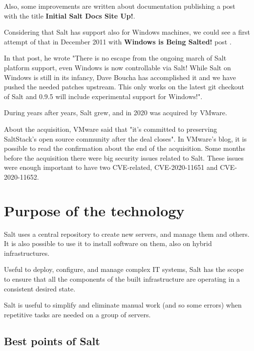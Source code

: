 \documentclass[12pt,a4paper,openright,twoside]{book}
\begin{document}
Also, some improvements are written about documentation publishing a post with the title \textbf{Initial Salt Docs Site Up!}\cite{saltPost}.


Considering that Salt has support also for Windows machines, we could see a first attempt of that in December 2011 with \textbf{Windows is Being Salted!} post \cite{saltPost2}.


In that post, he wrote "There is no escape from the ongoing march of Salt platform support, even Windows is now controllable via Salt! While Salt on Windows is still in its infancy, Dave Boucha has accomplished it and we have pushed the needed patches upstream. This only works on the latest git checkout of Salt and 0.9.5 will include experimental support for Windows!"\cite{saltPost2}.

During years after years, Salt grew, and in 2020 was acquired by VMware.

About the acquisition, VMware said that "it's committed to preserving SaltStack's open source community after the deal closes"\cite{saltAcq}.
In VMware's blog, it is possible to read the confirmation about the end of the acquisition\cite{saltAcqEnd}.
Some months before the acquisition there were big security issues related to Salt. These issues were enough important to have two CVE-related, CVE-2020-11651 and CVE-2020-11652.

\section{Purpose of the technology}
Salt uses a central repository to create new servers, and manage them and others. It is also possible to use it to install software on them, also on hybrid infrastructures.


Useful to deploy, configure, and manage complex IT systems, Salt has the scope to ensure that all the components of the built infrastructure are operating in a consistent desired state.


Salt is useful to simplify and eliminate manual work (and so some errors) when repetitive tasks are needed on a group of servers.

\subsection{Best points of Salt}
\end{document}
